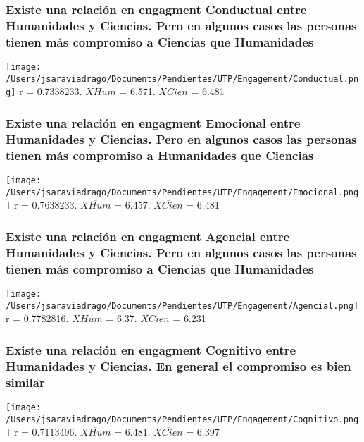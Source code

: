 \documentclass{beamer}
\begin{document}
\begin{frame}
\frametitle{Existe una relación en engagment Conductual entre Humanidades y Ciencias. Pero en algunos casos las personas tienen más compromiso a Ciencias que Humanidades}

\texttt{[image: /Users/jsaraviadrago/Documents/Pendientes/UTP/Engagement/Conductual.png]}
r = 0.7338233. $\overline{XHum}$ = 6.571. $\overline{XCien}$ = 6.481  
\end{frame}	

\begin{frame}
\frametitle{Existe una relación en engagment Emocional entre Humanidades y Ciencias. Pero en algunos casos las personas tienen más compromiso a Humanidades que Ciencias}

\texttt{[image: /Users/jsaraviadrago/Documents/Pendientes/UTP/Engagement/Emocional.png]}
r = 0.7638233. $\overline{XHum}$ = 6.457. $\overline{XCien}$ = 6.481  
\end{frame}	

\begin{frame}
\frametitle{Existe una relación en engagment Agencial entre Humanidades y Ciencias. Pero en algunos casos las personas tienen más compromiso a Ciencias que Humanidades}

\texttt{[image: /Users/jsaraviadrago/Documents/Pendientes/UTP/Engagement/Agencial.png]}
r = 0.7782816. $\overline{XHum}$ = 6.37. $\overline{XCien}$ = 6.231  
\end{frame}	
	
\begin{frame}
\frametitle{Existe una relación en engagment Cognitivo entre Humanidades y Ciencias. En general el compromiso es bien similar}

\texttt{[image: /Users/jsaraviadrago/Documents/Pendientes/UTP/Engagement/Cognitivo.png]}
r = 0.7113496. $\overline{XHum}$ = 6.481. $\overline{XCien}$ = 6.397

\end{frame}	
\end{document}
